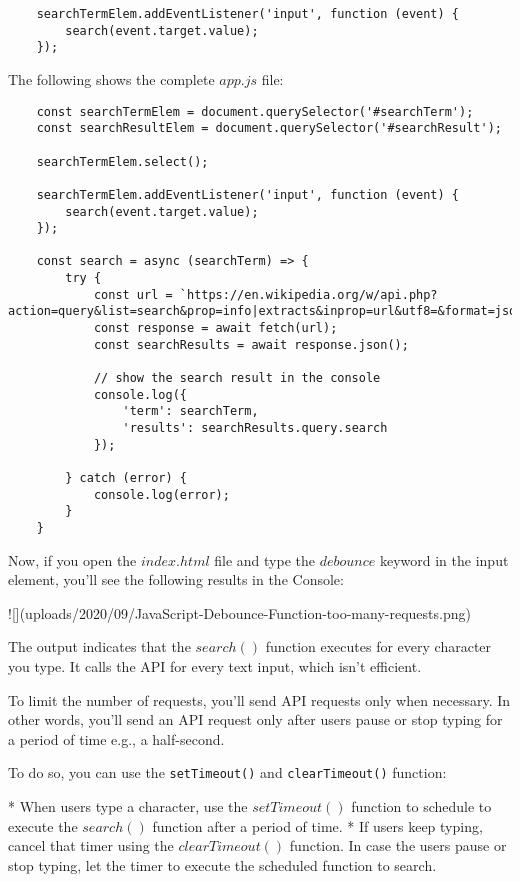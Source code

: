 \documentclass[11pt]{article}
\begin{document}
\begin{lstlisting}
    searchTermElem.addEventListener('input', function (event) {
        search(event.target.value);
    });
\end{lstlisting}

\noindent
The following shows the complete $app.js$ file:

\begin{lstlisting}
    const searchTermElem = document.querySelector('#searchTerm');
    const searchResultElem = document.querySelector('#searchResult');

    searchTermElem.select();

    searchTermElem.addEventListener('input', function (event) {
        search(event.target.value);
    });

    const search = async (searchTerm) => {
        try {
            const url = `https://en.wikipedia.org/w/api.php?action=query&list=search&prop=info|extracts&inprop=url&utf8=&format=json&origin=*&srlimit=10&srsearch=${searchTerm}`;
            const response = await fetch(url);
            const searchResults = await response.json();

            // show the search result in the console
            console.log({
                'term': searchTerm,
                'results': searchResults.query.search
            });

        } catch (error) {
            console.log(error);
        }
    }
\end{lstlisting}

\noindent
Now, if you open the $index.html$ file and type the $debounce$ keyword in
the input element, you'll see the following results in the Console:

![](uploads/2020/09/JavaScript-Debounce-Function-too-many-requests.png)

The output indicates that the $search()$ function executes for every
character you type. It calls the API for every text input,
which isn't efficient.
\newline

\noindent
To limit the number of requests, you'll send API requests only when
necessary. In other words, you'll send an API request only after users
pause or stop typing for a period of time e.g., a half-second.
\newline

\noindent
To do so, you can use the \verb|setTimeout()| and \verb|clearTimeout()| function:

* When users type a character, use the $setTimeout()$ function to schedule
to execute the $search()$ function after a period of time.
* If users keep typing, cancel that timer using the $clearTimeout()$ function.
In case the users pause or stop typing, let the timer to execute the
scheduled function to search.
\end{document}
